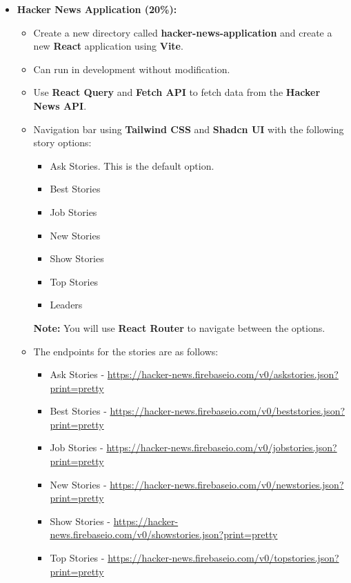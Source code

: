 \documentclass{article}
\begin{document}
	\begin{itemize}
	\item \textbf{Hacker News Application (20\%):}
	\begin{itemize}
		\item Create a new directory called \textbf{hacker-news-application} and create a new \textbf{React} application using \textbf{Vite}.
		\item Can run in development without modification.
		\item Use \textbf{React Query} and \textbf{Fetch API} to fetch data from the \textbf{Hacker News API}.
		\item Navigation bar using \textbf{Tailwind CSS} and \textbf{Shadcn UI} with the following story options:
		\begin{itemize}
			\item Ask Stories. This is the default option.
			\item Best Stories
			\item Job Stories
			\item New Stories
			\item Show Stories
			\item Top Stories
			\item Leaders
		\end{itemize}
		\textbf{Note:} You will use \textbf{React Router} to navigate between the options.
	\item The endpoints for the stories are as follows:
	\begin{itemize}
		\item Ask Stories - \href{https://hacker-news.firebaseio.com/v0/askstories.json?print=pretty}{https://hacker-news.firebaseio.com/v0/askstories.json?print=pretty}
		\item Best Stories - \href{https://hacker-news.firebaseio.com/v0/beststories.json?print=pretty}{https://hacker-news.firebaseio.com/v0/beststories.json?print=pretty}
		\item Job Stories - \href{https://hacker-news.firebaseio.com/v0/jobstories.json?print=pretty}{https://hacker-news.firebaseio.com/v0/jobstories.json?print=pretty}
		\item New Stories - \href{https://hacker-news.firebaseio.com/v0/newstories.json?print=pretty}{https://hacker-news.firebaseio.com/v0/newstories.json?print=pretty}
		\item Show Stories - \href{https://hacker-news.firebaseio.com/v0/showstories.json?print=pretty}{https://hacker-news.firebaseio.com/v0/showstories.json?print=pretty}
		\item Top Stories - \href{https://hacker-news.firebaseio.com/v0/topstories.json?print=pretty}{https://hacker-news.firebaseio.com/v0/topstories.json?print=pretty}

\end{itemize}
\end{itemize}
\end{itemize}
\end{document}
